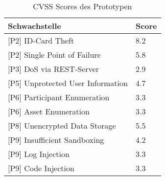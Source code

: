     	\begin{table}[H]
            \centering
            \sffamily
            \begin{tabular}{|l|l|}
            \hline
\textbf{Schwachstelle}                & \textbf{Score} \\ \hline
\rowcolor{light-gray}
{[}P2{]} ID-Card Theft                & \cellcolor{redorange}8.2            \\ \hline
{[}P2{]} Single Point of Failure      & \cellcolor{orange}5.8            \\ \hline
\rowcolor{light-gray}
{[}P3{]} DoS via REST-Server          & \cellcolor{yellow}2.9            \\ \hline
{[}P5{]} Unprotected User Information & \cellcolor{orange}4.7            \\ \hline
\rowcolor{light-gray}
{[}P6{]} Participant Enumeration      & \cellcolor{yellow}3.3            \\ \hline
{[}P6{]} Asset Enumeration            & \cellcolor{yellow}3.3            \\ \hline
\rowcolor{light-gray}
{[}P8{]} Unencrypted Data Storage     & \cellcolor{orange}5.5            \\ \hline
{[}P9{]} Insufficient Sandboxing      & \cellcolor{orange}4.2            \\ \hline
\rowcolor{light-gray}
{[}P9{]} Log Injection                & \cellcolor{yellow}3.3            \\ \hline
{[}P9{]} Code Injection               & \cellcolor{yellow}3.3            \\ \hline
            \end{tabular}
            \caption[CVSS Scores des Prototypen]{CVSS Scores des Prototypen}
            \label{tab:eval_cvss_short}
        \end{table}
